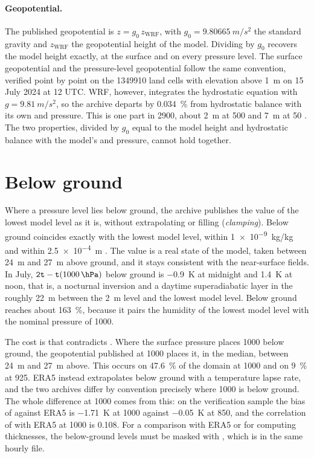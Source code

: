 \paragraph{Geopotential.} The published geopotential is $z = g_0\, z_\text{WRF}$, with
$g_0 = \SI{9.80665}{m/s^2}$ the standard gravity and $z_\text{WRF}$ the geopotential height of the
model. Dividing  by $g_0$ recovers the model height exactly, at the surface and on every
pressure level. The surface geopotential and the pressure-level geopotential follow the same
convention, verified point by point on the \num{1349910} land cells with elevation above \SI{1}{m} on
15 July 2024 at 12 UTC. WRF, however, integrates the hydrostatic equation with
$g = \SI{9.81}{m/s^2}$, so the archive departs by \SI{0.034}{\percent} from hydrostatic balance
with its own  and pressure. This is one part in \num{2900}, about \SI{2}{m} at
\SI{500}{\hPa} and \SI{7}{m} at \SI{50}{\hPa} \parencite{issue39}. The two properties, 
divided by $g_0$ equal to the model height and hydrostatic balance with the model's  and
pressure, cannot hold together.

\section{Below ground}
\label{sec:sotto-terreno}

Where a pressure level lies below ground, the archive publishes the value of the lowest model
level as it is, without extrapolating or filling (\emph{clamping}). Below ground 
coincides exactly with the lowest model level,  within \SI{1e-9}{kg/kg} and 
within \SI{2.5e-4}{m} \parencite{issue44}. The value is a real state of the model, taken between
\SI{24}{m} and \SI{27}{m} above ground, and it stays consistent with the near-surface fields. In
July, $\campo{2t} - \campo{t}(\SI{1000}{\hPa})$ below ground is \SI{-0.9}{K} at midnight and
\SI{+1.4}{K} at noon, that is, a nocturnal inversion and a daytime superadiabatic layer in the
roughly \SI{22}{m} between the \SI{2}{m} level and the lowest model level. Below ground 
reaches about \SI{163}{\percent}, because it pairs the humidity of the lowest model level with the
nominal pressure of \SI{1000}{\hPa}.

The cost is that  contradicts . Where the surface pressure places
\SI{1000}{\hPa} below ground, the geopotential published at \SI{1000}{\hPa} places it, in the
median, between \SI{24}{m} and \SI{27}{m} above. This occurs on \SI{47.6}{\percent} of the domain
at \SI{1000}{\hPa} and on \SI{9}{\percent} at \SI{925}{\hPa}. ERA5 instead extrapolates below
ground with a temperature lapse rate, and the two archives differ by convention precisely where
\SI{1000}{\hPa} is below ground. The whole difference at \SI{1000}{\hPa} comes from this: on the
verification sample the bias of  against ERA5 is \SI{-1.71}{K} at \SI{1000}{\hPa} against
\SI{-0.05}{K} at \SI{850}{\hPa}, and the correlation of  with ERA5 at \SI{1000}{\hPa} is
\num{0.108}. For a comparison with ERA5 or for computing thicknesses, the below-ground levels
must be masked with , which is in the same hourly file.


